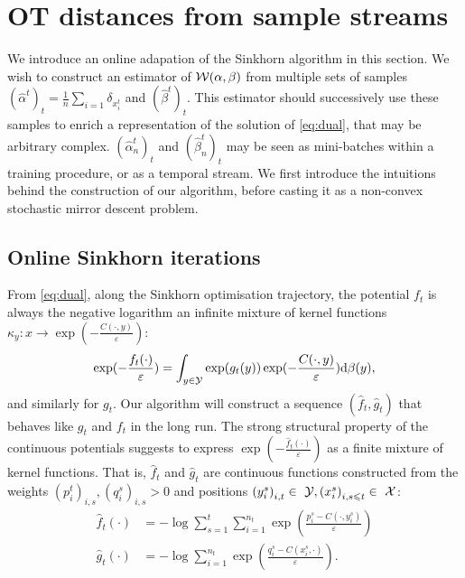 
\section{OT distances from sample streams}

We introduce an online adapation of the Sinkhorn algorithm in this section. We
wish to construct an estimator of $\mathcal{W}(\alpha,\beta)$ from multiple sets of
samples $(\hat \alpha^t)_t = \frac{1}{n} \sum_{i=1} \delta_{x_i^t}$
 and $(\hat \beta^t)_t$. This estimator should
successively use these samples to enrich a representation of the solution of
\eqref{eq:dual}, that may be arbitrary complex. $(\hat \alpha_n^t)_t$ and $(\hat
\beta_n^t)_t$ may be seen as mini-batches within a training procedure, or as a
temporal stream. We first introduce the intuitions behind the construction of
our algorithm, before casting it as a non-convex stochastic mirror descent
problem.

\subsection{Online Sinkhorn iterations}

From \eqref{eq:dual}, along the Sinkhorn optimisation trajectory, the potential $f_t$ is always the negative logarithm an
infinite mixture of kernel functions $\kappa_y: x \to \exp(-\frac{C(\cdot, y)}{\varepsilon})$:
\begin{equation}
    \exp(-\frac{f_t(\cdot)}{\varepsilon}) = 
    \int_{y \in \mathcal{Y}} \exp(g_t(y))  \exp(-\frac{C(\cdot, y)}{\varepsilon}) \textrm{d} \beta(y),
\end{equation}
and similarly for $g_t$. Our algorithm will construct a sequence $(\hat f_t,
\hat g_t)$ that behaves like $g_t$ and $f_t$ in the long run. The strong
structural property of the continuous potentials suggests to express $\exp(-\frac{\hat f_t(\cdot)}{\varepsilon})$ as a
finite mixture of kernel functions. That is, $\hat f_t$ and $\hat g_t$ are continuous
functions constructed from the weights ${(p_i^t)}_{i,s}, {(q_i^s)}_{i,s} > 0$ and positions
${(y_i^s)}_{i,t} \in~\mathcal{Y}, {(x_i^s)}_{i,s\leqslant t} \in~\mathcal{X}$:
\begin{align}
    \hat f_t(\cdot) &= - \log \sum_{s=1}^t \sum_{i=1}^{n_t} 
    \exp(\frac{p_i^s - C(\cdot, y_i^s)}{\varepsilon}) \\
    \hat g_t(\cdot) &= - \log \sum_{i=1}^{n_t} 
    \exp(\frac{q_i^s - C(x_i^s, \cdot)}{\varepsilon}).
\end{align}

